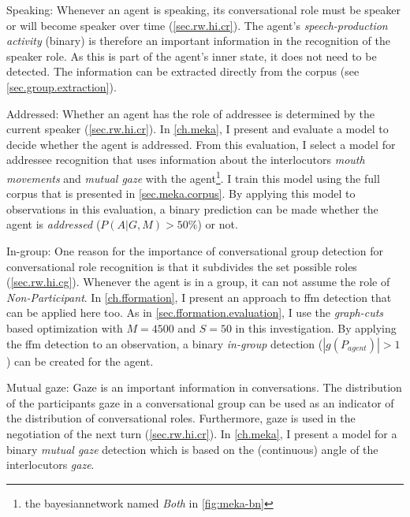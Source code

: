 \begin{description}
\item{Speaking:} Whenever an agent is speaking, its \gls{conversational role} must be \gls{speaker} or will become \gls{speaker} over time (\cref{sec.rw.hi.cr}).
The agent's \emph{speech-production activity} (binary) is therefore an important information in the recognition of the \gls{speaker} role.
As this is part of the agent's inner state, it does not need to be detected.
The information can be extracted directly from the corpus (see \cref{sec.group.extraction}).
\item{Addressed:} Whether an agent has the role of \gls{addressee} is determined by the current \gls{speaker} (\cref{sec.rw.hi.cr}).
In \cref{ch.meka}, I present and evaluate a model to decide whether the agent is addressed.
From this evaluation, I select a model for \gls{addressee} recognition that uses information about the interlocutors \emph{mouth movements} and \emph{mutual gaze} with the agent\footnote{the \gls{bayesiannetwork} named \emph{Both} in \vref{fig:meka-bn}}.
I train this model using the full corpus that is presented in \cref{sec.meka.corpus}.
By applying this model to observations in this evaluation, a binary prediction can be made whether the agent is \emph{addressed} (\(P(A|G,M)>50\%\)) or not.
\item{In-group:} One reason for the importance of \gls{conversational group} detection for \gls{conversational role} recognition is that it subdivides the set possible roles (\cref{sec.rw.hi.cg}).
Whenever the agent is in a group, it can not assume the role of \emph{Non-Participant}.
In \cref{ch.fformation}, I present an approach to \gls{ffm} detection that can be applied here too.
As in \cref{sec.fformation.evaluation}, I use the \emph{graph-cuts} based optimization with \(M=4500\) and \(S=50\) in this investigation.
By applying the \gls{ffm} detection to an observation, a binary \emph{in-group} detection (\(|g(P_{agent})|>1\)) can be created for the agent.
\item{Mutual gaze:} Gaze is an important information in \glspl{conversation}.
The distribution of the participants gaze in a \gls{conversational group} can be used as an indicator of the distribution of \glspl{conversational role}.
Furthermore, gaze is used in the negotiation of the next \gls{turn} (\cref{sec.rw.hi.cr}).
In \cref{ch.meka}, I present a model for a binary \emph{mutual gaze} detection which is based on the (continuous) angle of the interlocutors \emph{gaze}.

\end{description}
